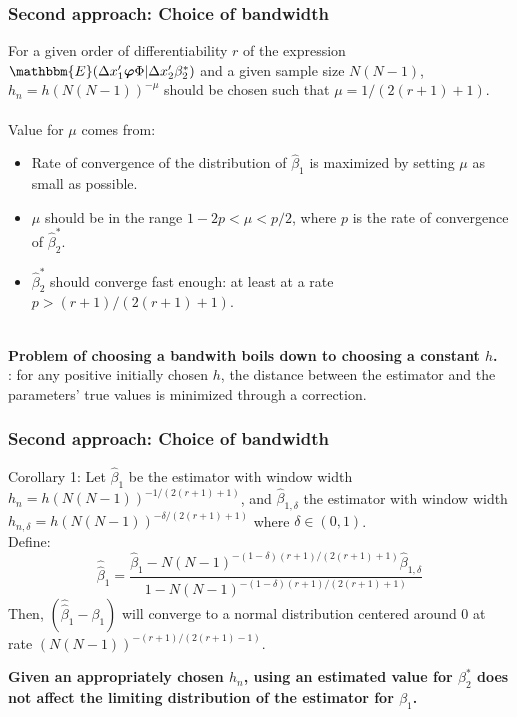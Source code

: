 \begin{frame}[label = h choice]
    \frametitle{Second approach: Choice of bandwidth}
    For a given order of differentiability $r$ of the expression $\mathbbm{E}(\Delta x_1' \bm{\varphi} \Phi \rvert \Delta x_2'\beta_2^*)$ and a given sample size $N(N-1)$, $h_n=h (N(N-1))^{-\mu}$ should be chosen such that $\mu = 1/(2 (r+1) +1)$. 
    \\~\\ 
    Value for $\mu$ comes from:
    \begin{itemize}
        \item Rate of convergence of the distribution of $\hat{\beta}_1$ is maximized by setting $\mu$ as small as possible.
        \item $\mu$ should be in the range $1-2p < \mu < p/2$, where $p$ is the rate of convergence of $\hat{\beta}_2^*$.
        \item  $\hat{\beta}_2^*$ should  converge fast enough: at least at a rate $p> (r+1)/(2(r+1)+1)$. \\~\\
    \end{itemize}  
    \textbf{Problem of choosing a bandwith boils down to choosing a constant $h$.} \\
    \cite{kyriazidou1997estimation}: for any positive initially chosen $h$, the distance between the estimator and the parameters' true values is minimized through a correction.
\end{frame}

\begin{frame}
    \frametitle{Second approach: Choice of bandwidth}
    \begin{block}{Corollary 1:}
        Let $\hat{\beta}_1$ be the estimator with window width $h_n = h  (N(N-1))^{-1/(2 (r+1) +1)}$, and $\hat{\beta}_{1,\delta}$ the estimator with window width $h_{n,\delta} = h  (N(N-1))^{-\delta/(2 (r+1) +1)}$ where $\delta \in (0,1)$. \\
        Define:
         $$\hat{\hat{\beta}}_1 = \frac{\hat{\beta}_1 - N(N-1)^{-(1-\delta)(r+1)/(2(r+1)+1)} \hat{\beta}_{1,\delta}}{1 - N(N-1)^{-(1-\delta)(r+1)/(2(r+1)+1)}}$$
         Then, $(\hat{\hat{\beta}}_1 - \beta_1)$ will converge to a normal distribution centered around 0 at rate $(N(N-1))^{-(r+1)/(2(r+1)-1)}$.
    \end{block}
    \textbf{Given an appropriately chosen $h_n$, using an estimated value for $\beta_2^*$ does not affect the limiting distribution of the estimator for $\beta_1$.}
\end{frame}
